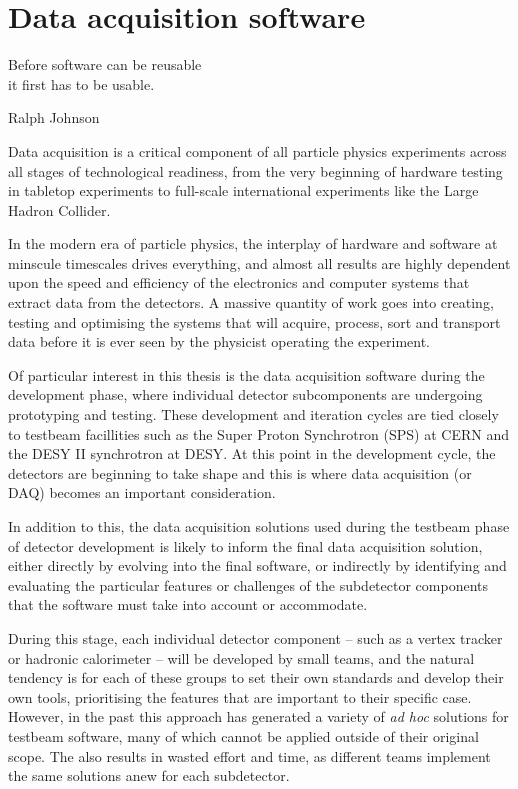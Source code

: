 \chapter{Data acquisition software}
\label{chapter:dqm4hep}

\epigraph{Before software can be reusable \\it first has to be usable.}{Ralph Johnson}

Data acquisition is a critical component of all particle physics experiments across all stages of technological readiness, from the very beginning of hardware testing in tabletop experiments to full-scale international experiments like the Large Hadron Collider. 

In the modern era of particle physics, the interplay of hardware and software at minscule timescales drives everything, and almost all results are highly dependent upon the speed and efficiency of the electronics and computer systems that extract data from the detectors. A massive quantity of work goes into creating, testing and optimising the systems that will acquire, process, sort and transport data before it is ever seen by the physicist operating the experiment.

Of particular interest in this thesis is the data acquisition software during the development phase, where individual detector subcomponents are undergoing prototyping and testing. These development and iteration cycles are tied closely to testbeam facillities such as the Super Proton Synchrotron (SPS) at CERN and the DESY II synchrotron at DESY. At this point in the development cycle, the detectors are beginning to take shape and this is where data acquisition (or DAQ) becomes an important consideration. 

In addition to this, the data acquisition solutions used during the testbeam phase of detector development is likely to inform the final data acquisition solution, either directly by evolving into the final software, or indirectly by identifying and evaluating the particular features or challenges of the subdetector components that the software must take into account or accommodate.

During this stage, each individual detector component -- such as a vertex tracker or hadronic calorimeter -- will be developed by small teams, and the natural tendency is for each of these groups to set their own standards and develop their own tools, prioritising the features that are important to their specific case. However, in the past this approach has generated a variety of \textit{ad hoc} solutions for testbeam software, many of which cannot be applied outside of their original scope. The also results in wasted effort and time, as different teams implement the same solutions anew for each subdetector.

